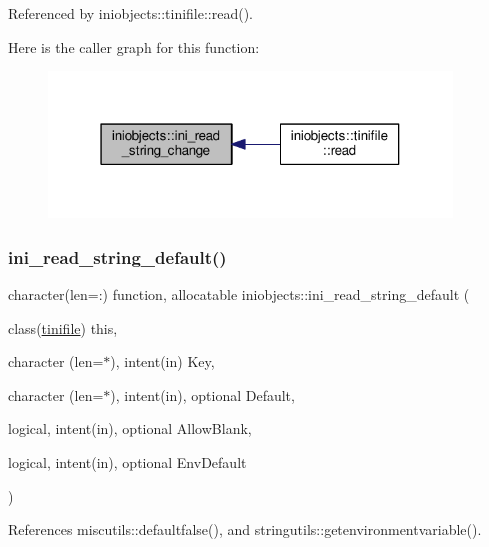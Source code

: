 Referenced by iniobjects\+::tinifile\+::read().

Here is the caller graph for this function\+:
\nopagebreak
\begin{figure}[H]
\begin{center}
\leavevmode
\includegraphics[width=304pt]{namespaceiniobjects_a6770561ba1885823e0a1d5d341cb7fa5_icgraph}
\end{center}
\end{figure}
\mbox{\label{namespaceiniobjects_a7a7f7950cdd1ae3e2c9e977fb7ce87a7}} 
\subsubsection{\texorpdfstring{ini\+\_\+read\+\_\+string\+\_\+default()}{ini\_read\_string\_default()}}
{\footnotesize\ttfamily character(len=\+:) function, allocatable iniobjects\+::ini\+\_\+read\+\_\+string\+\_\+default (\begin{DoxyParamCaption}\item[{class(\mbox{\hyperlink{structiniobjects_1_1tinifile}{tinifile}})}]{this,  }\item[{character (len=$\ast$), intent(in)}]{Key,  }\item[{character (len=$\ast$), intent(in), optional}]{Default,  }\item[{logical, intent(in), optional}]{Allow\+Blank,  }\item[{logical, intent(in), optional}]{Env\+Default }\end{DoxyParamCaption})\hspace{0.3cm}{\ttfamily [private]}}



References miscutils\+::defaultfalse(), and stringutils\+::getenvironmentvariable().


